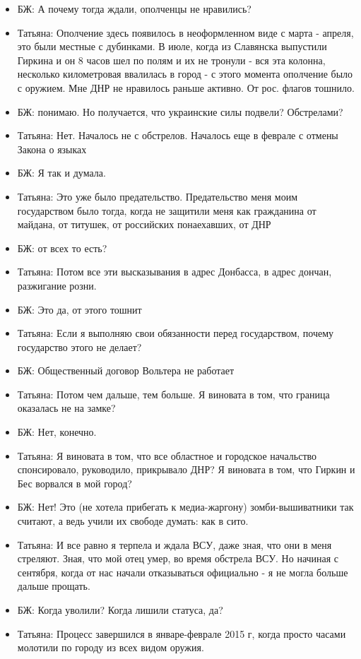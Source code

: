 \begin{itemize}
\item БЖ: А почему тогда ждали, ополченцы не нравились?
\item Татьяна: Ополчение здесь появилось в неоформленном виде с марта - апреля, это были местные с дубинками. В июле, когда из Славянска выпустили Гиркина и он 8 часов шел по полям и их не тронули - вся эта колонна, несколько километровая ввалилась в город - с этого момента ополчение было с оружием. Мне ДНР не нравилось раньше активно. От рос. флагов тошнило.
\item БЖ: понимаю. Но получается, что украинские силы подвели? Обстрелами?
\item Татьяна: Нет. Началось не с обстрелов. Началось еще в феврале с отмены Закона о языках
\item БЖ: Я так и думала.
\item Татьяна: Это уже было предательство. Предательство меня моим государством было тогда, когда не защитили меня как гражданина от майдана, от титушек, от российских понаехавших, от ДНР
\item БЖ: от всех то есть?
\item Татьяна: Потом все эти высказывания в адрес Донбасса, в адрес дончан, разжигание розни.
\item БЖ: Это да, от этого тошнит
\item Татьяна: Если я выполняю свои обязанности перед государством, почему государство этого не делает?
\item БЖ: Общественный договор Вольтера не работает
\item Татьяна: Потом чем дальше, тем больше. Я виновата в том, что граница оказалась не на замке?
\item БЖ: Нет, конечно.
\item Татьяна: Я виновата в том, что все областное и городское начальство спонсировало, руководило, прикрывало ДНР? Я виновата в том, что Гиркин и Бес ворвался в мой город?
\item БЖ: Нет! Это (не хотела прибегать к медиа-жаргону) зомби-вышиватники так считают, а ведь учили их свободе думать: как в сито. 
\item Татьяна: И все равно я терпела и ждала ВСУ, даже зная, что они в меня стреляют. Зная, что мой отец умер, во время обстрела ВСУ. Но начиная с сентября, когда от нас начали отказываться официально - я не могла больше дальше прощать.
\item БЖ: Когда уволили? Когда лишили статуса, да?
\item Татьяна: Процесс завершился в январе-феврале 2015 г, когда просто часами молотили по городу из всех видом оружия.

\end{itemize}
